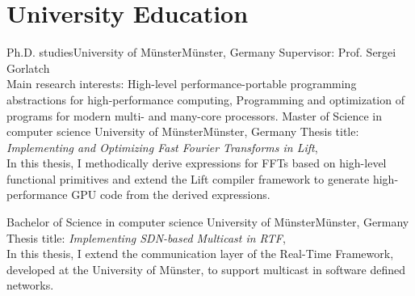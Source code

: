 \documentclass[11pt,a4paper,sans]{moderncv}        %
\begin{document}
\nocite{*}
\makecvtitle

\section{University Education}
          {Ph.D. studies}{University of Münster}{Münster, Germany}{}{
          Supervisor: Prof. Sergei Gorlatch\\
          Main research interests: High-level performance-portable programming abstractions for high-performance computing,
          Programming and optimization of programs for modern multi- and many-core processors.}
					{Master of Science in computer science}
          {University of Münster}{Münster, Germany}{}
					{Thesis title: \textit{Implementing and Optimizing Fast Fourier Transforms in Lift},\\
           In this thesis, I methodically derive expressions for FFTs based on high-level functional primitives and extend the Lift compiler framework to generate high-performance GPU code from the derived expressions.}

					{Bachelor of Science in computer science}
          {University of Münster}{Münster, Germany}{}
					{Thesis title: \textit{Implementing SDN-based Multicast in RTF},\\
          In this thesis, I extend the communication layer of the Real-Time Framework, developed at the University of Münster, to support multicast in software defined networks.}

\printbibheading[title={Publications}]
\printbibliography[heading=none]
%
%

\end{document}
